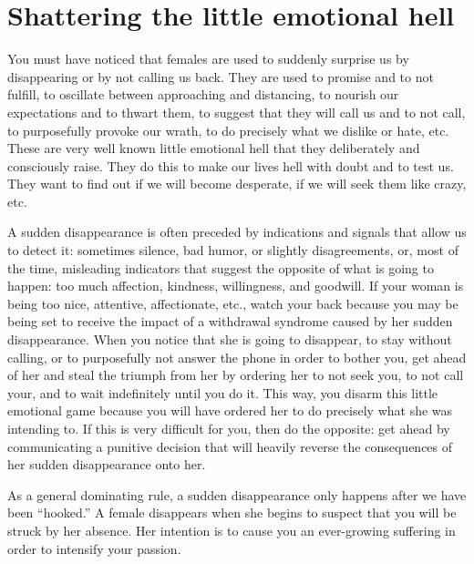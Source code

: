\section{Shattering the little emotional hell}

\par You must have noticed that females are used to suddenly surprise us by disappearing or by not calling us back. They are used to promise and to not fulfill, to oscillate between approaching and distancing, to nourish our expectations and to thwart them, to suggest that they will call us and to not call, to purposefully provoke our wrath, to do precisely what we dislike or hate, etc. These are very well known little emotional hell that they deliberately and consciously raise. They do this to make our lives hell with doubt and to test us. They want to find out if we will become desperate, if we will seek them like crazy, etc.

\par A sudden disappearance is often preceded by indications and signals that allow us to detect it: sometimes silence, bad humor, or slightly disagreements, or, most of the time, misleading indicators that suggest the opposite of what is going to happen: too much affection, kindness, willingness, and goodwill. If your woman is being too nice, attentive, affectionate, etc., watch your back because you may be being set to receive the impact of a withdrawal syndrome caused by her sudden disappearance. When you notice that she is going to disappear, to stay without calling, or to purposefully not answer the phone in order to bother you, get ahead of her and steal the triumph from her by ordering her to not seek you, to not call your, and to wait indefinitely until you do it. This way, you disarm this little emotional game because you will have ordered her to do precisely what she was intending to. If this is very difficult for you, then do the opposite: get ahead by communicating a punitive decision that will heavily reverse the consequences of her sudden disappearance onto her.

\par As a general dominating rule, a sudden disappearance only happens after we have been \enquote{hooked.} A female disappears when she begins to suspect that you will be struck by her absence. Her intention is to cause you an ever-growing suffering in order to intensify your passion.